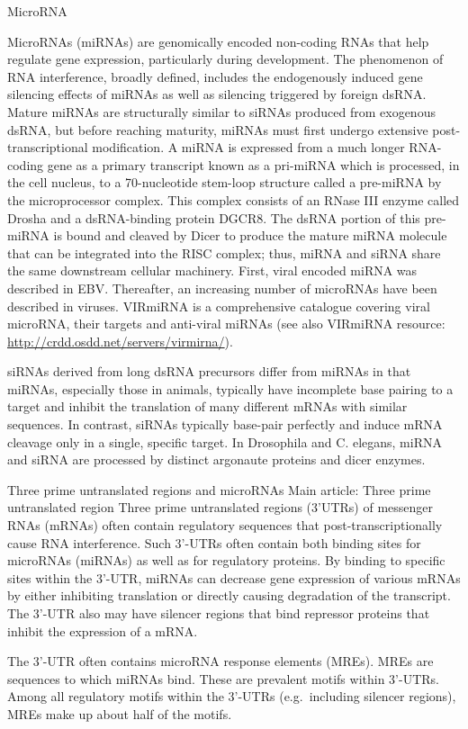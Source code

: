MicroRNA

MicroRNAs (miRNAs) are genomically encoded non-coding RNAs that help regulate gene expression, particularly during development. The phenomenon of RNA interference, broadly defined, includes the endogenously induced gene silencing effects of miRNAs as well as silencing triggered by foreign dsRNA. Mature miRNAs are structurally similar to siRNAs produced from exogenous dsRNA, but before reaching maturity, miRNAs must first undergo extensive post-transcriptional modification. A miRNA is expressed from a much longer RNA-coding gene as a primary transcript known as a pri-miRNA which is processed, in the cell nucleus, to a 70-nucleotide stem-loop structure called a pre-miRNA by the microprocessor complex. This complex consists of an RNase III enzyme called Drosha and a dsRNA-binding protein DGCR8. The dsRNA portion of this pre-miRNA is bound and cleaved by Dicer to produce the mature miRNA molecule that can be integrated into the RISC complex; thus, miRNA and siRNA share the same downstream cellular machinery. First, viral encoded miRNA was described in EBV. Thereafter, an increasing number of microRNAs have been described in viruses. VIRmiRNA is a comprehensive catalogue covering viral microRNA, their targets and anti-viral miRNAs (see also VIRmiRNA resource: \url{http://crdd.osdd.net/servers/virmirna/}).

siRNAs derived from long dsRNA precursors differ from miRNAs in that miRNAs, especially those in animals, typically have incomplete base pairing to a target and inhibit the translation of many different mRNAs with similar sequences. In contrast, siRNAs typically base-pair perfectly and induce mRNA cleavage only in a single, specific target. In Drosophila and C. elegans, miRNA and siRNA are processed by distinct argonaute proteins and dicer enzymes.

Three prime untranslated regions and microRNAs
Main article: Three prime untranslated region
Three prime untranslated regions (3'UTRs) of messenger RNAs (mRNAs) often contain regulatory sequences that post-transcriptionally cause RNA interference. Such 3'-UTRs often contain both binding sites for microRNAs (miRNAs) as well as for regulatory proteins. By binding to specific sites within the 3'-UTR, miRNAs can decrease gene expression of various mRNAs by either inhibiting translation or directly causing degradation of the transcript. The 3'-UTR also may have silencer regions that bind repressor proteins that inhibit the expression of a mRNA.

The 3'-UTR often contains microRNA response elements (MREs). MREs are sequences to which miRNAs bind. These are prevalent motifs within 3'-UTRs. Among all regulatory motifs within the 3'-UTRs (e.g.~including silencer regions), MREs make up about half of the motifs.

